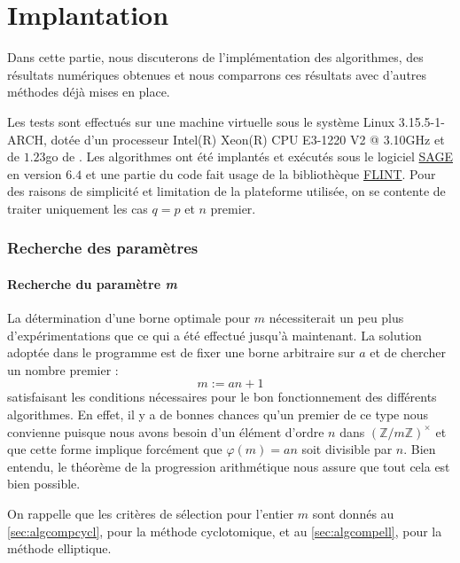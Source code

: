 \documentclass[a4paper]{article} %
\numberwithin{section}{part}
\numberwithin{equation}{section}
\newcommand\zmodninv[1]{(\mathbb{Z}/#1\mathbb{Z})^{\times}}
\begin{document}
\part{Implantation}
\label{trois}
Dans cette partie, nous discuterons de l'implémentation des algorithmes, des
résultats numériques obtenues et nous comparrons ces résultats avec d'autres
méthodes déjà mises en place.\par
Les tests sont effectués sur une machine virtuelle sous le système Linux 
3.15.5-1-ARCH, dotée d'un processeur Intel(R) Xeon(R) CPU E3-1220 V2 @ 3.10GHz 
et de $1.23$go de . Les algorithmes ont été implantés et 
exécutés sous le logiciel \href{http://www.sagemath.org/}{SAGE} en version 
$6.4$ et une partie du code fait usage de la bibliothèque 
\href{http://www.flintlib.org/}{FLINT}. Pour des raisons de simplicité et
limitation de la plateforme utilisée, on se contente de traiter uniquement les 
cas $q = p$ et $n$ premier.
\section{Recherche des paramètres}

\subsection{Recherche du paramètre \emph{m}}
La détermination d'une borne optimale pour $m$ nécessiterait un peu plus
d'expérimentations que ce qui a été effectué jusqu'à maintenant. La solution 
adoptée dans le programme est de fixer une borne arbitraire sur $a$ et de 
chercher un nombre premier :
\begin{equation}
\label{eq:formedem}
m := an + 1 
\end{equation}
satisfaisant les conditions nécessaires pour le bon fonctionnement
des différents algorithmes. En effet, il y a de bonnes chances qu'un premier de 
ce type nous convienne puisque nous avons besoin d'un élément d'ordre $n$ dans
$\zmodninv{m}$ et que cette forme implique forcément que $\varphi(m) = 
an$ soit divisible par $n$. Bien entendu, le théorème de la progression
arithmétique nous assure que tout cela est bien possible.\par
On rappelle que les critères de sélection pour l'entier $m$ sont donnés au 
\ref{sec:algcompcycl}, pour la méthode cyclotomique, et au \ref{sec:algcompell},
pour la méthode elliptique.
\end{document}

